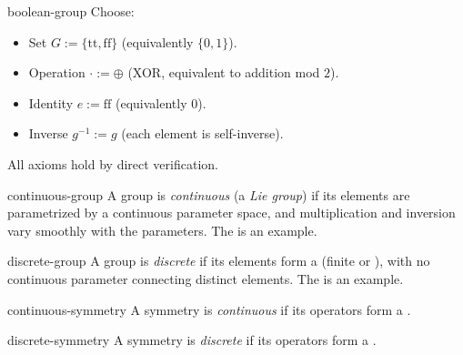 \documentclass[12pt]{article}
\begin{document}
\begin{eg}{boolean-group}
  Choose:
  \begin{itemize}[nosep]
    \item Set $G := \{\text{tt}, \text{ff}\}$ (equivalently $\{0, 1\}$).
    \item Operation $\cdot := \oplus$ (XOR, equivalent to addition mod $2$).
    \item Identity $e := \text{ff}$ (equivalently $0$).
    \item Inverse $g^{-1} := g$ (each element is self-inverse).
  \end{itemize}
  All axioms hold by direct verification.
\end{eg}

\begin{dfn}{continuous-group}
  A group is \emph{continuous} (a \emph{Lie group}) if its elements are parametrized by a {\color{blue}continuous parameter space}, and multiplication and inversion vary smoothly with the parameters. The  is an example.
\end{dfn}

\begin{dfn}{discrete-group}
  A group is \emph{discrete} if its elements form a  (finite or ), with no continuous parameter connecting distinct elements. The  is an example.
\end{dfn}


\begin{dfn}{continuous-symmetry}
  A symmetry is \emph{continuous} if its operators form a .
\end{dfn}

\begin{dfn}{discrete-symmetry}
  A symmetry is \emph{discrete} if its operators form a .
\end{dfn}
\end{document}
